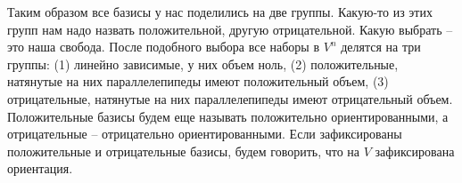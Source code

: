 Таким образом все базисы у нас поделились на две группы.
Какую-то из этих групп нам надо назвать положительной, другую отрицательной.
Какую выбрать -- это наша свобода.
После подобного выбора все наборы в $V^n$ делятся на три группы: (1) линейно зависимые, у них объем ноль, (2) положительные, натянутые на них параллелепипеды имеют положительный объем, (3) отрицательные, натянутые на них параллелепипеды имеют отрицательный объем.
Положительные базисы будем еще называть положительно ориентированными, а отрицательные -- отрицательно ориентированными.
Если зафиксированы положительные и отрицательные базисы, будем говорить, что на $V$ зафиксирована ориентация.
